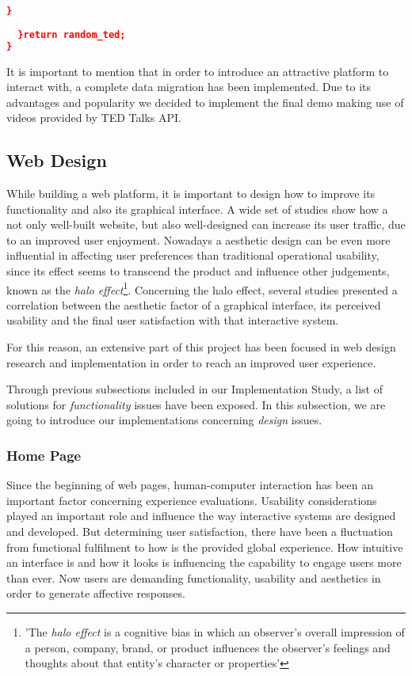 \documentclass{acm_proc_article-sp}
\begin{document}
\begin{lstlisting}[language=json,firstnumber=1]
      }
      
  }return random_ted; 
}
\end{lstlisting}

It is important to mention that in order to introduce an attractive platform to interact with, a complete data migration has been implemented. Due to its advantages and popularity we decided to implement the final demo making use of videos provided by TED Talks API\cite{cettolo2012wit3}.

\subsection{Web Design}
While building a web platform, it is important to design how to improve its functionality and also its graphical interface. A wide set of studies \cite{allen2012smashing} show how a not only well-built website, but also well-designed can increase its user traffic, due to an improved user enjoyment. Nowadays a aesthetic design 
can be even more influential in affecting user preferences 
than traditional operational usability, since its effect seems to transcend the product and influence other judgements, known as the \textit{halo effect}\cite{de2006interaction}\cite{wiki:halo}\footnote{'The \textit{halo effect} is a cognitive bias in which an observer's overall impression of a person, company, brand, or product influences the observer's feelings and thoughts about that entity's character or properties'}. Concerning the halo effect, several studies \cite{de2006interaction} presented a correlation between the aesthetic factor of a graphical interface, its perceived usability and the final user satisfaction with that interactive system. 

For this reason, an extensive part of this project has been focused in web design research and implementation in order to reach an improved user experience. 

Through previous subsections included in our Implementation Study, a list of solutions for \textit{functionality} issues have been exposed. In this subsection, we are going to introduce our implementations concerning \textit{design} issues. 

\subsubsection{Home Page}
Since the beginning of web pages, human-computer interaction has been an important factor concerning experience evaluations\cite{monk2004product}. Usability considerations played an important role and influence the way interactive systems are designed and developed\cite{green2003pleasure}. But determining user satisfaction, there have been a  fluctuation from functional fulfilment to how is the provided global experience\cite{de2006interaction}. How intuitive an interface is and how it looks is influencing the capability to engage users more than ever\cite{allen2012smashing}. Now users are demanding functionality, usability and aesthetics in order to generate affective responses. 
\end{document}
